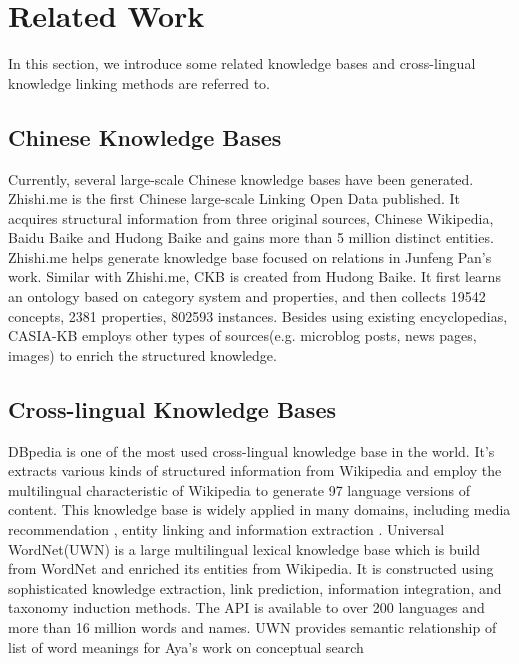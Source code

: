 \documentclass[runningheads,a4paper]{llncs}
\begin{document}
\section{Related Work}
\label{sec:work}
In this section, we introduce some related knowledge bases and cross-lingual knowledge linking methods are referred to.
\subsection{Chinese Knowledge Bases}
Currently, several large-scale Chinese knowledge bases have been generated. Zhishi.me\cite{niu2011zhishi,wang2014publishing} is the first Chinese large-scale Linking Open Data published. It acquires structural information from three original sources, Chinese Wikipedia, Baidu Baike and Hudong Baike and gains more than 5 million distinct entities. Zhishi.me helps generate knowledge base focused on relations in Junfeng Pan’s work\cite{pan2012building}.
Similar with Zhishi.me, CKB\cite{wang2012building} is created from Hudong Baike. It first learns an ontology based on category system and properties, and then collects 19542 concepts, 2381 properties, 802593 instances. Besides using existing encyclopedias, CASIA-KB employs other types of sources(e.g. microblog posts, news pages, images) to enrich the structured knowledge.
\subsection{Cross-lingual Knowledge Bases}
DBpedia \cite{auer2007dbpedia,mendes2012dbpedia} is one of the most used cross-lingual knowledge base in the world. It's extracts various kinds of structured information from Wikipedia and employ the multilingual characteristic of Wikipedia to generate 97 language versions of content. This knowledge base is widely applied in many domains, including media recommendation \cite{passant2010dbrec,fernandez2011generic,kaminskas2012knowledge}, entity linking\cite{mendes2011evaluating} and information extraction \cite{dutta2013integrating}.
Universal WordNet(UWN)\cite{de2012uwn} is a large multilingual lexical knowledge base which is build from WordNet and enriched its entities from Wikipedia. It is constructed using sophisticated knowledge extraction, link prediction, information integration, and taxonomy induction methods. The API is available to over 200 languages and more than 16 million words and names. UWN provides semantic relationship of list of word meanings for Aya's work on conceptual search \cite{al2015conceptual}
\end{document}
